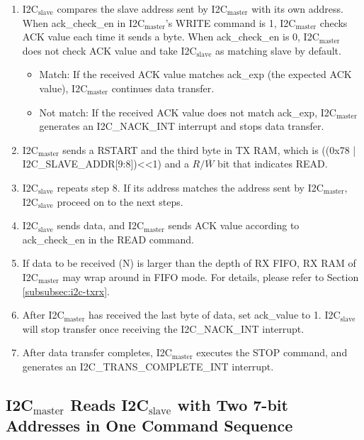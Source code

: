 \documentclass[main\_\_EN.tex]{subfiles}
\begin{document}
\begin{enumerate}
\item I2C$_\text{slave}$ compares the slave address sent by I2C$_\text{master}$ with its own address. When ack\_check\_en in I2C$_\text{master}$'s WRITE command is 1, I2C$_\text{master}$ checks ACK value each time it sends a byte. When ack\_check\_en is 0, I2C$_\text{master}$ does not check ACK value and take I2C$_\text{slave}$ as matching slave by default.
\begin{itemize}
\item Match: If the received ACK value matches ack\_exp (the expected ACK value), I2C$_\text{master}$ continues data transfer.
\item Not match: If the received ACK value does not match ack\_exp, I2C$_\text{master}$ generates an I2C\_NACK\_INT interrupt and stops data transfer.
\end{itemize}

\item I2C$_\text{master}$ sends a RSTART and the third byte in TX RAM, which is ((0x78 | I2C\_SLAVE\_ADDR[9:8])<<1) and a $R/\overline W$ bit that indicates READ.
\item I2C$_\text{slave}$ repeats step 8. If its address matches the address sent by I2C$_\text{master}$, I2C$_\text{slave}$ proceed on to the next steps.

\item I2C$_\text{slave}$ sends data, and I2C$_\text{master}$ sends ACK value according to ack\_check\_en in the READ command.

\item If data to be received (N) is larger than the depth of RX FIFO, RX RAM of I2C$_\text{master}$ may wrap around in FIFO mode. For details, please refer to Section \ref{subsubsec:i2c-txrx}.

\item After I2C$_\text{master}$ has received the last byte of data, set ack\_value to 1. I2C$_\text{slave}$ will stop transfer once receiving the I2C\_NACK\_INT interrupt.

\item After data transfer completes, I2C$_\text{master}$ executes the STOP command, and generates an I2C\_TRANS\_COMPLETE\_INT interrupt.
\end{enumerate}

\clearpage
\subsection{\texorpdfstring{I2C$_\text{master}$ Reads I2C$_\text{slave}$ with Two 7-bit Addresses in One Command Sequence}{I2C master Reads I2C slave with Two 7-bit Addresses in One Command Sequence}}
\end{document}

